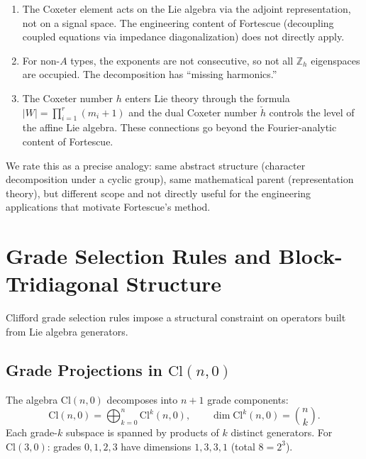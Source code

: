 \documentclass[11pt]{article}
\newcommand{\Cl}{\mathrm{Cl}}
\newcommand{\ZZ}{\mathbb{Z}}
\begin{document}
\begin{enumerate}[leftmargin=*]
\item The Coxeter element acts on the Lie algebra via the adjoint
  representation, not on a signal space. The engineering content of
  Fortescue (decoupling coupled equations via impedance diagonalization)
  does not directly apply.

\item For non-$A$ types, the exponents are not consecutive, so
  not all $\ZZ_h$ eigenspaces are occupied. The decomposition has
  ``missing harmonics.''

\item The Coxeter number $h$ enters Lie theory through the formula
  $|W| = \prod_{i=1}^r (m_i + 1)$ and the dual Coxeter number
  $\check{h}$ controls the level of the affine Lie algebra. These
  connections go beyond the Fourier-analytic content of Fortescue.
\end{enumerate}

We rate this as a precise analogy: same abstract structure
(character decomposition under a cyclic group), same mathematical
parent (representation theory), but different scope and not
directly useful for the engineering applications that motivate
Fortescue's method.

\section{Grade Selection Rules and Block-Tridiagonal Structure}
\label{sec:grade-selection}

Clifford grade selection rules impose a structural constraint on
operators built from Lie algebra generators.

\subsection{Grade Projections in $\Cl(n,0)$}

The algebra $\Cl(n,0)$ decomposes into $n+1$ grade components:
\begin{equation}\label{eq:grade-decomp}
  \Cl(n,0) = \bigoplus_{k=0}^{n} \Cl^k(n,0),
  \qquad \dim \Cl^k(n,0) = \binom{n}{k}.
\end{equation}
Each grade-$k$ subspace is spanned by products of $k$ distinct
generators. For $\Cl(3,0)$: grades $0, 1, 2, 3$ have dimensions
$1, 3, 3, 1$ (total $8 = 2^3$).
\end{document}

